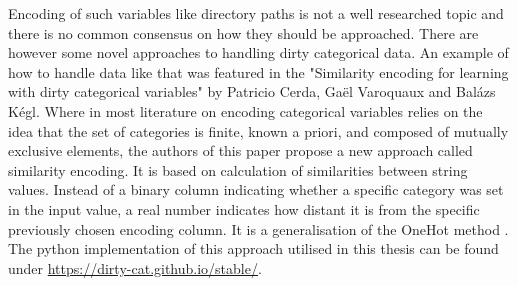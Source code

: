 \documentclass[a4paper,twoside,12pt]{book}
\begin{document}
Encoding of such variables like directory paths is not a well researched topic and there is no 
common consensus on how they should be approached. There are however some novel approaches to 
handling dirty categorical data. An example of how to handle data like that was featured in the 
"Similarity encoding for learning with dirty categorical variables" by Patricio Cerda,  Ga{\"e}l 
Varoquaux and Bal{\'a}zs K{\'e}gl. Where in most literature on encoding categorical variables 
relies on the idea that the set of categories is finite, known a priori, and composed of mutually 
exclusive elements, the authors of this paper propose a new approach called similarity encoding. 
It is based on calculation of similarities between string values. Instead of a binary column 
indicating whether a specific category was set in the input value, a real number indicates how 
distant it is from the specific previously chosen encoding column. It is a generalisation of the 
OneHot method \cite{bib:dirtycat}. The python implementation of this approach utilised in this thesis 
can be found under \url{https://dirty-cat.github.io/stable/}.

\end{document}
